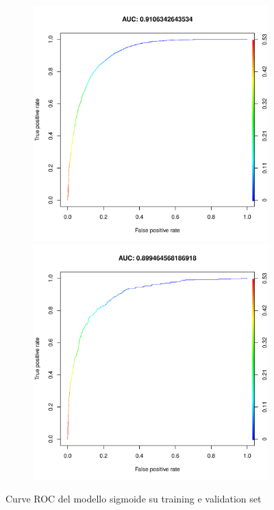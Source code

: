 \begin{figure}[H]
	\centering
	\begin{subfigure}[t]{1\textwidth}
		\begin{minipage}[t]{0.475\textwidth}
			\includegraphics[width=\textwidth]{images/ml/mlp/holdout/sigmoid-training}
		\end{minipage}
		\hfill
		\begin{minipage}[t]{0.475\textwidth}
			\includegraphics[width=\textwidth]{images/ml/mlp/holdout/sigmoid-test}
		\end{minipage}
	\end{subfigure}
	\caption{Curve ROC del modello sigmoide su training e validation set}
	\label{fig:mlp_h_s_roc}
\end{figure}

